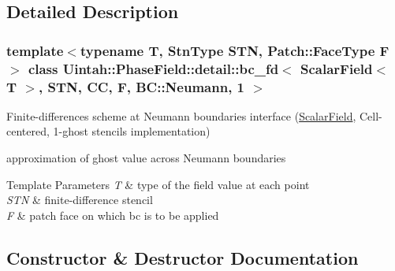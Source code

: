 \subsection{Detailed Description}
\subsubsection*{template$<$typename T, Stn\+Type S\+TN, Patch\+::\+Face\+Type F$>$\newline
class Uintah\+::\+Phase\+Field\+::detail\+::bc\+\_\+fd$<$ Scalar\+Field$<$ T $>$, S\+T\+N, C\+C, F, B\+C\+::\+Neumann, 1 $>$}

Finite-\/differences scheme at Neumann boundaries interface (\hyperlink{structUintah_1_1PhaseField_1_1ScalarField}{Scalar\+Field}, Cell-\/centered, 1-\/ghost stencils implementation) 

approximation of ghost value across Neumann boundaries


\begin{DoxyTemplParams}{Template Parameters}
{\em T} & type of the field value at each point \\
\hline
{\em S\+TN} & finite-\/difference stencil \\
\hline
{\em F} & patch face on which bc is to be applied \\
\hline
\end{DoxyTemplParams}


\subsection{Constructor \& Destructor Documentation}
\mbox{\label{classUintah_1_1PhaseField_1_1detail_1_1bc__fd_3_01ScalarField_3_01T_01_4_00_01STN_00_01CC_00_01F_00_01BC_1_1Neumann_00_011_01_4_a0cc2c3bcc51bbd5a2961f277df27e359}} 
